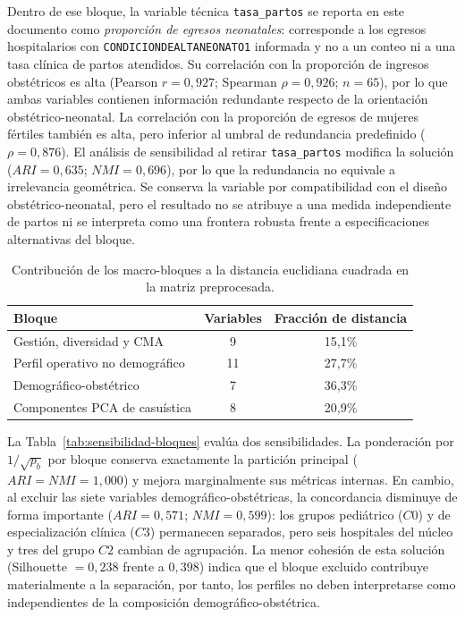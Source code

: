 Dentro de ese bloque, la variable técnica \texttt{tasa\_partos} se reporta en
este documento como \emph{proporción de egresos neonatales}: corresponde a los
egresos hospitalarios con \texttt{CONDICIONDEALTANEONATO1} informada y no a un
conteo ni a una tasa clínica de partos atendidos. Su correlación con la
proporción de ingresos obstétricos es alta (Pearson $r=0{,}927$; Spearman
$\rho=0{,}926$; $n=65$), por lo que ambas variables contienen información
redundante respecto de la orientación obstétrico-neonatal. La correlación con la
proporción de egresos de mujeres fértiles también es alta, pero inferior al
umbral de redundancia predefinido ($\rho=0{,}876$). El análisis de sensibilidad
al retirar \texttt{tasa\_partos} modifica la solución ($ARI=0{,}635$;
$NMI=0{,}696$), por
lo que la redundancia no equivale a irrelevancia geométrica. Se conserva la
variable por compatibilidad con el diseño obstétrico-neonatal, pero el resultado
no se atribuye a una medida independiente de partos ni se interpreta como una
frontera robusta frente a especificaciones alternativas del bloque.

\begin{table}[htbp]
\centering
\caption{Contribución de los macro-bloques a la distancia euclidiana cuadrada en la matriz preprocesada.}
\label{tab:contribucion-bloques}
\begin{tabular}{l c c}
\toprule
\textbf{Bloque} & \textbf{Variables} & \textbf{Fracción de distancia} \\
\midrule
Gestión, diversidad y CMA & 9 & 15,1\% \\
Perfil operativo no demográfico & 11 & 27,7\% \\
Demográfico-obstétrico & 7 & 36,3\% \\
Componentes PCA de casuística & 8 & 20,9\% \\
\bottomrule
\end{tabular}
\end{table}

La Tabla~\ref{tab:sensibilidad-bloques} evalúa dos sensibilidades. La
ponderación por $1/\sqrt{p_b}$ por bloque conserva exactamente la partición
principal ($ARI=NMI=1{,}000$) y mejora marginalmente sus métricas internas.
En cambio, al excluir las siete variables demográfico-obstétricas, la
concordancia disminuye de forma importante ($ARI=0{,}571$; $NMI=0{,}599$): los
grupos pediátrico ($C0$) y de especialización clínica ($C3$) permanecen separados, pero seis hospitales
del núcleo y tres del grupo $C2$ cambian de agrupación. La menor cohesión de
esta solución (Silhouette $=0{,}238$ frente a $0{,}398$) indica que el bloque
excluido contribuye materialmente a la separación, por tanto, los perfiles no
deben interpretarse como independientes de la composición
demográfico-obstétrica.

